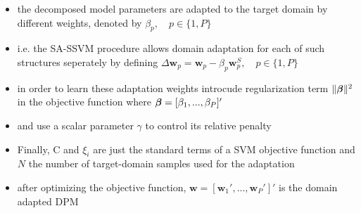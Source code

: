 \documentclass[]{article}
\begin{document}
\begin{itemize}
	\item the decomposed model parameters are adapted to the target domain by different weights, denoted by $\beta_p, \quad p \in \{1, P\}$
	\item i.e. the SA-SSVM procedure allows domain adaptation for each of such structures seperately by defining $\Delta \mathbf{w}_p = \mathbf{w}_p - \beta_p \mathbf{w}_p^S, \quad p \in \{1, P\}$
	\item in order to learn these adaptation weights introcude regularization term $\lVert \mbox{\boldmath$\beta$} \rVert^2$ in the objective function where $\mbox{\boldmath$\beta$} = [\beta_1, ..., \beta_P]'$
	\item and use a scalar parameter $\gamma$ to control its relative penalty
	\item Finally, C and $\xi_i$ are just the standard terms of a SVM objective function and $N$ the number of target-domain samples used for the adaptation
	\item after optimizing the objective function, $\mathbf{w} = [\mathbf{w}_1',..., \mathbf{w}_P']'$ is the domain adapted DPM
\end{itemize}
\end{document}
